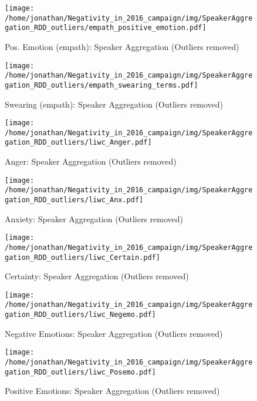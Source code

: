 \begin{figure}[h]\centering
	\texttt{[image: /home/jonathan/Negativity\_in\_2016\_campaign/img/SpeakerAggregation\_RDD\_outliers/empath\_positive\_emotion.pdf]}
	\caption{Pos. Emotion (empath): Speaker Aggregation (Outliers removed)}
	\label{fig: sa_Pos. Emotion (empath)}
\end{figure}

\begin{figure}[h]\centering
	\texttt{[image: /home/jonathan/Negativity\_in\_2016\_campaign/img/SpeakerAggregation\_RDD\_outliers/empath\_swearing\_terms.pdf]}
	\caption{Swearing (empath): Speaker Aggregation (Outliers removed)}
	\label{fig: sa_Swearing (empath)}
\end{figure}

\begin{figure}[h]\centering
	\texttt{[image: /home/jonathan/Negativity\_in\_2016\_campaign/img/SpeakerAggregation\_RDD\_outliers/liwc\_Anger.pdf]}
	\caption{Anger: Speaker Aggregation (Outliers removed)}
	\label{fig: sa_Anger}
\end{figure}

\begin{figure}[h]\centering
	\texttt{[image: /home/jonathan/Negativity\_in\_2016\_campaign/img/SpeakerAggregation\_RDD\_outliers/liwc\_Anx.pdf]}
	\caption{Anxiety: Speaker Aggregation (Outliers removed)}
	\label{fig: sa_Anxiety}
\end{figure}

\begin{figure}[h]\centering
	\texttt{[image: /home/jonathan/Negativity\_in\_2016\_campaign/img/SpeakerAggregation\_RDD\_outliers/liwc\_Certain.pdf]}
	\caption{Certainty: Speaker Aggregation (Outliers removed)}
	\label{fig: sa_Certainty}
\end{figure}

\begin{figure}[h]\centering
	\texttt{[image: /home/jonathan/Negativity\_in\_2016\_campaign/img/SpeakerAggregation\_RDD\_outliers/liwc\_Negemo.pdf]}
	\caption{Negative Emotions: Speaker Aggregation (Outliers removed)}
	\label{fig: sa_Negative Emotions}
\end{figure}

\begin{figure}[h]\centering
	\texttt{[image: /home/jonathan/Negativity\_in\_2016\_campaign/img/SpeakerAggregation\_RDD\_outliers/liwc\_Posemo.pdf]}
	\caption{Positive Emotions: Speaker Aggregation (Outliers removed)}
	\label{fig: sa_Positive Emotions}
\end{figure}

